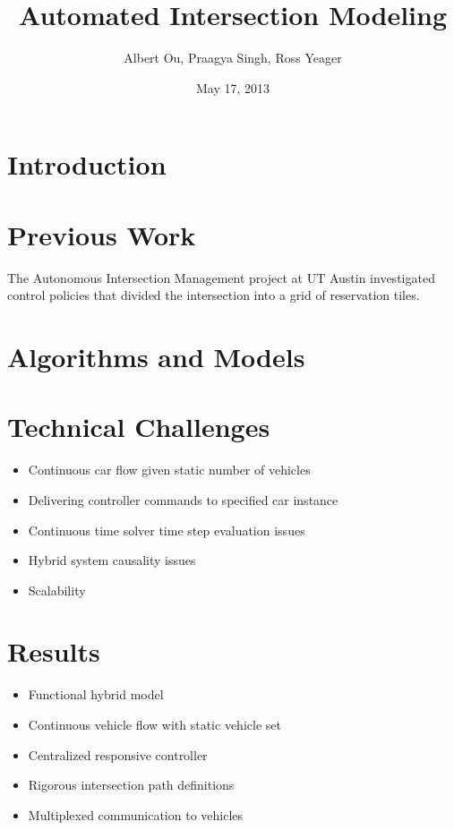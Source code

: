 \documentclass[11pt,letterpaper]{article}
\title{Automated Intersection Modeling}
\author{Albert Ou, Praagya Singh, Ross Yeager}
\date{May 17, 2013}
\begin{document}
\maketitle

\section{Introduction}


\section{Previous Work}

The Autonomous Intersection Management project at UT Austin investigated
control policies that divided the intersection into a grid of reservation
tiles.\cite{Dresner}

\section{Algorithms and Models}




\section{Technical Challenges}

\begin{itemize}
\setlength{\itemsep}{0pt}
\setlength{\parskip}{0pt}
\item Continuous car flow given static number of vehicles
\item Delivering controller commands to specified car instance
\item Continuous time solver time step evaluation issues
\item Hybrid system causality issues
\item Scalability
\end{itemize}

\section{Results}

\begin{itemize}
\setlength{\itemsep}{0pt}
\setlength{\parskip}{0pt}
\item Functional hybrid model
\item Continuous vehicle flow with static vehicle set
\item Centralized responsive controller
\item Rigorous intersection path definitions
\item Multiplexed communication to vehicles
\end{itemize}
\end{document}
